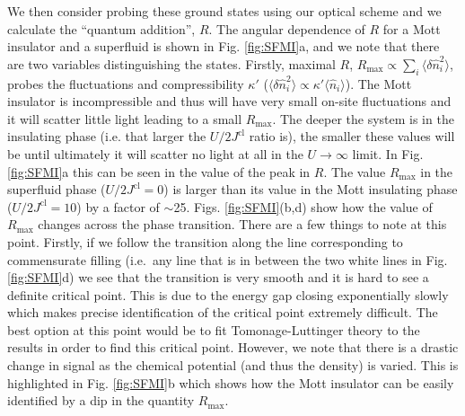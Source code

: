We then consider probing these ground states using our optical scheme
and we calculate the ``quantum addition'', $R$. The angular dependence
of $R$ for a Mott insulator and a superfluid is shown in
Fig. \ref{fig:SFMI}a, and we note that there are two variables
distinguishing the states. Firstly, maximal $R$, $R_\text{max} \propto
\sum_i \langle \delta \hat{n}_i^2 \rangle$, probes the fluctuations
and compressibility $\kappa'$ ($\langle \delta \hat{n}^2_i \rangle
\propto \kappa' \langle \hat{n}_i \rangle$).  The Mott insulator is
incompressible and thus will have very small on-site fluctuations and
it will scatter little light leading to a small $R_\text{max}$. The
deeper the system is in the insulating phase (i.e. that larger the
$U/2J^\text{cl}$ ratio is), the smaller these values will be until
ultimately it will scatter no light at all in the $U \rightarrow
\infty$ limit. In Fig. \ref{fig:SFMI}a this can be seen in the value
of the peak in $R$. The value $R_\text{max}$ in the superfluid phase
($U/2J^\text{cl} = 0$) is larger than its value in the Mott insulating
phase ($U/2J^\text{cl} = 10$) by a factor of
$\sim$25. Figs. \ref{fig:SFMI}(b,d) show how the value of
$R_\text{max}$ changes across the phase transition. There are a few
things to note at this point. Firstly, if we follow the transition
along the line corresponding to commensurate filling (i.e.~any line
that is in between the two white lines in Fig. \ref{fig:SFMI}d) we see
that the transition is very smooth and it is hard to see a definite
critical point. This is due to the energy gap closing exponentially
slowly which makes precise identification of the critical point
extremely difficult. The best option at this point would be to fit
Tomonage-Luttinger theory to the results in order to find this
critical point. However, we note that there is a drastic change in
signal as the chemical potential (and thus the density) is
varied. This is highlighted in Fig. \ref{fig:SFMI}b which shows how
the Mott insulator can be easily identified by a dip in the quantity
$R_\text{max}$.

